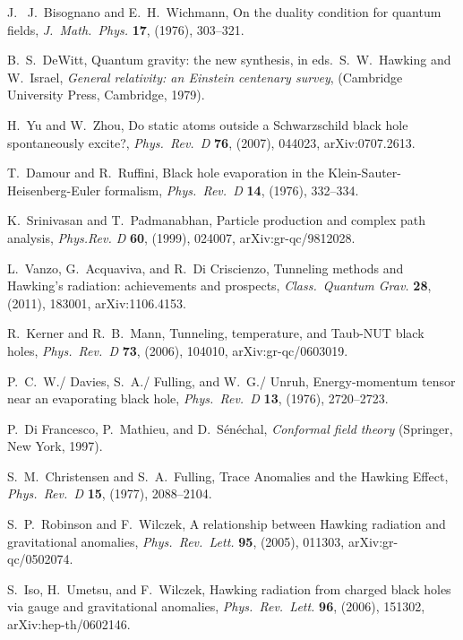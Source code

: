 \documentclass[12pt]{article}
\begin{document}
\begin{thebibliography}{999}
 J.~ J.\ Bisognano and E.~H.\ Wichmann, 
On the duality condition for quantum fields, \emph{J.\ Math.\ Phys.}
{\bf 17}, (1976), 303--321.

 B.~S.\ DeWitt, Quantum gravity: the new synthesis,
in eds.\ S.~W.\ Hawking and W.\ Israel, \emph{General relativity: an
Einstein centenary survey}, (Cambridge University Press, Cambridge,
1979).

 H.\ Yu and W.\ Zhou, Do static atoms outside a 
Schwarzschild black hole spontaneously excite?, \emph{Phys.\ Rev.\ D}
{\bf 76}, (2007), 044023, arXiv:0707.2613.

 T.\ Damour and R.\ Ruffini, Black hole evaporation 
in the Klein-Sauter-Heisenberg-Euler formalism, \emph{Phys.\ Rev.\ D}
{\bf 14}, (1976), 332--334.

 K.\ Srinivasan and T.\ Padmanabhan, Particle 
production and complex path analysis, \emph{Phys.Rev. D} {\bf 60}, 
(1999), 024007, arXiv:gr-qc/9812028.

 L.\ Vanzo, G.\ Acquaviva, and R.\ Di Criscienzo,
Tunneling methods and Hawking's radiation: achievements and prospects,
\emph{Class.\ Quantum Grav.} {\bf 28}, (2011), 183001,
arXiv:1106.4153.

 R.\ Kerner and R.~B.\ Mann, Tunneling, temperature, and 
Taub-NUT black holes, \emph{Phys.\ Rev.\ D} {\bf 73}, (2006),
104010, arXiv:gr-qc/0603019.

 P.~C.~W./ Davies, S.~A./ Fulling, and W.~G./ Unruh,
Energy-momentum tensor near an evaporating black hole, \emph{Phys.\
Rev.\ D} {\bf 13}, (1976), 2720--2723.

 P.\ Di Francesco, P.\ Mathieu, and D.\ S{\'e}n{\'e}chal,
 \emph{Conformal field theory} (Springer, New York, 1997).

 S.~M.\ Christensen and S.~A.\ Fulling,
Trace Anomalies and the Hawking Effect, \emph{Phys.\ Rev.\ D}
{\bf 15}, (1977), 2088--2104.

 S.~P.\ Robinson and F.\ Wilczek, A relationship 
between Hawking radiation and gravitational anomalies, \emph{Phys.\ 
Rev.\ Lett.} {\bf 95}, (2005), 011303, arXiv:gr-qc/0502074.

 S.\ Iso, H.\ Umetsu, and F.\ Wilczek, Hawking radiation 
from charged black holes via gauge and gravitational anomalies,
\emph{Phys.\ Rev.\ Lett.} {\bf 96}, (2006), 151302, arXiv:hep-th/0602146.


\end{thebibliography}
\end{document}
